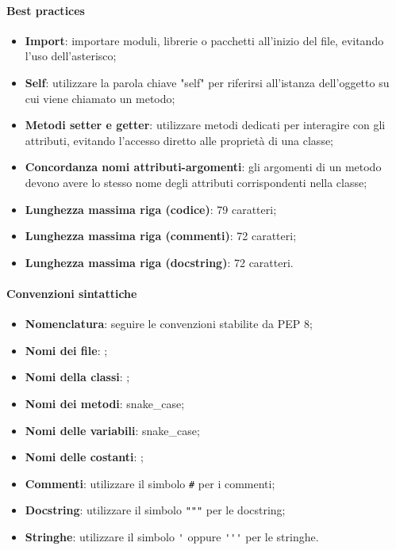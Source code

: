 \paragraph*{Best practices}
\begin{itemize}
  \item \textbf{Import}: importare moduli, librerie o pacchetti all'inizio del file, evitando l'uso dell'asterisco;
  \item \textbf{Self}: utilizzare la parola chiave "self" per riferirsi all'istanza dell'oggetto su cui viene chiamato un metodo;
  \item \textbf{Metodi setter e getter}: utilizzare metodi dedicati per interagire con gli attributi, evitando l'accesso diretto alle proprietà di una classe;
  \item \textbf{Concordanza nomi attributi-argomenti}: gli argomenti di un metodo devono avere lo stesso nome degli attributi corrispondenti nella classe;
  \item \textbf{Lunghezza massima riga (codice)}: 79 caratteri;
  \item \textbf{Lunghezza massima riga (commenti)}: 72 caratteri;
  \item \textbf{Lunghezza massima riga (docstring)}: 72 caratteri.
\end{itemize}

\paragraph*{Convenzioni sintattiche}
\begin{itemize}
  \item \textbf{Nomenclatura}: seguire le convenzioni stabilite da PEP 8;
  \item \textbf{Nomi dei file}: ;
  \item \textbf{Nomi della classi}: ;
  \item \textbf{Nomi dei metodi}: snake\_case;
  \item \textbf{Nomi delle variabili}: snake\_case;
  \item \textbf{Nomi delle costanti}: ;
  \item \textbf{Commenti}: utilizzare il simbolo \verb|#| per i commenti;
  \item \textbf{Docstring}: utilizzare il simbolo \verb|"""| per le docstring;
  \item \textbf{Stringhe}: utilizzare il simbolo \verb|'| oppure \verb|'''| per le stringhe.
\end{itemize}

